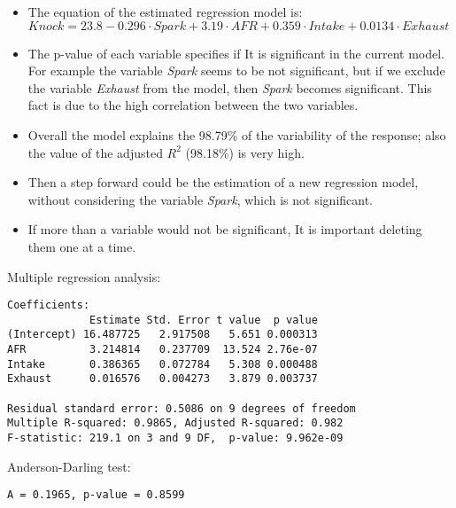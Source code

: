 \begin{frame}
  \begin{small}
    \begin{itemize}
      \item The equation of the estimated regression model is: $ Knock = 23.8 - 0.296 \cdot Spark + 3.19 \cdot AFR + 0.359 \cdot Intake + 0.0134 \cdot Exhaust $
      \item The p-value of each variable specifies if It is significant in the current model. For example the variable \textit{Spark} seems to be not significant, but if we exclude the variable \textit{Exhaust} from the model, then \textit{Spark} becomes significant. This fact is due to the high correlation between the two variables.
      \item Overall the model explains the 98.79\% of the variability of the response; also the value of the adjusted $ R^2 $ (98.18\%) is very high.
      \item Then a step forward could be the estimation of a new regression model, without considering the variable \textit{Spark}, which is not significant.
      \item If more than a variable would not be significant, It is important deleting them one at a time.
    \end{itemize}
  \end{small}
\end{frame}

\begin{frame}[fragile]
  Multiple regression analysis:\\
  \begin{small}
    \begin{verbatim}
Coefficients:
             Estimate Std. Error t value  p value    
(Intercept) 16.487725   2.917508   5.651 0.000313
AFR          3.214814   0.237709  13.524 2.76e-07
Intake       0.386365   0.072784   5.308 0.000488
Exhaust      0.016576   0.004273   3.879 0.003737

Residual standard error: 0.5086 on 9 degrees of freedom
Multiple R-squared: 0.9865,	Adjusted R-squared: 0.982 
F-statistic: 219.1 on 3 and 9 DF,  p-value: 9.962e-09 
    \end{verbatim}
  \end{small}
  Anderson-Darling test:\\
  \begin{small}
    \begin{verbatim}
A = 0.1965, p-value = 0.8599
    \end{verbatim}
  \end{small}
\end{frame}

